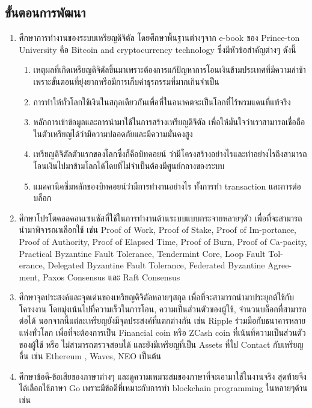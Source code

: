 \documentclass[letterpaper, 10pt, conference]{ieeeconf}
\begin{document}
\subsection{ขั้นตอนการพัฒนา}
\begin{enumerate}
	\item ศึกษาการทำงานของระบบเหรียญดิจิตัล โดยศึกษาพื้นฐานต่างๆจาก e-book ของ Prince-ton University คือ Bitcoin and cryptocurrency technology ซึ่งมีหัวข้อสำคัญต่างๆ ดังนี้ 
	\begin{enumerate}
		\item เหตุผลที่เกิดเหรียญดิจิตัลขึ้นมาเพราะต้องการแก้ปัญหาการโอนเงินข้ามประเทศที่มีความล่าช้าเพราะขั้นตอนที่ยุ่งยากหรือมีการเก็บค่าธุรกรรมที่มากเกินจำเป็น
		\item การทำให้ทั่วโลกใช้เงินในสกุลเดียวกันเพื่อที่ในอนาคตจะเป็นโลกที่ไร้พรมแดนที่แท้จริง
		\item หลักการเข้าข้อมูลและการนำมาใช้ในการสร้างเหรียญดิจิตัล เพื่อให้มั่นใจว่าเราสามารถเชื่อถือในตัวเหรียญได้ว่ามีความปลอดภัยและมีความมั่นคงสูง
		\item เหรียญดิจิตัลตัวแรกของโลกซึ่งก็คือบิทคอยน์ ว่ามีโครงสร้างอย่างไรและทำอย่างไรถึงสามารถโอนเงินไปมาข้ามโลกได้โดยที่ไม่จำเป็นต้องมีศูนย์กลางของระบบ
		\item แมคคานิคซึ่มหลักของบิทคอยน์ว่ามีการทำงานอย่างไร ทั้งการทำ transaction และการต่อบล็อก 
	\end{enumerate}
	\item ศึกษาโปรโตคอลคอนเซนซัสที่ใช้ในการทำงานด้านระบบแบบกระจายหลายๆตัว เพื่อที่จะสามารถนำมาพิจารณาเลือกใช้ เช่น Proof of Work, Proof of Stake, Proof of Im-portance, Proof of Authority, Proof of Elapsed Time, Proof of Burn, Proof of Ca-pacity, Practical Byzantine Fault Tolerance, Tendermint Core, Loop Fault Tol-erance, Delegated Byzantine Fault Tolerance, Federated Byzantine Agree-ment, Paxos Consensus และ Raft Consensus
	\item ศึกษาจุดประสงค์และจุดเด่นของเหรียญดิจิตัลหลายๆสกุล เพื่อที่จะสามารถนำมาประยุกต์ใช้กับโครงงาน โดยมุ่งเน้นไปที่ความเร็วในการโอน, ความเป็นส่วนตัวของผู้ใช้, จำนวนบล็อกที่สามารถต่อได้ นอกจากนี้แต่ละเหรียญยังมีจุดประสงค์ที่แตกต่างกัน เช่น Ripple ร่วมมือกับธนาคารหลายแห่งทั่วโลก เพื่อที่จะต้องการเป็น Financial coin หรือ ZCash coin ที่เน้นที่ความเป็นส่วนตัวของผู้ใช้ หรือ ไม่สามารถตรวจสอบได้ และยังมีเหรียญที่เป็น Assets ที่ไป Contact กับเหรียญอื่น เช่น Ethereum , Waves, NEO เป็นต้น
	\item ศึกษาข้อดี-ข้อเสียของภาษาต่างๆ และดูความเหมาะสมของภาษาที่จะเอามาใช้ในงานจริง สุดท้ายจึงได้เลือกใช้ภาษา Go เพราะมีข้อดีที่เหมาะกับการทำ blockchain programming ในหลายๆด้าน เช่น

\end{enumerate}
\end{document}
